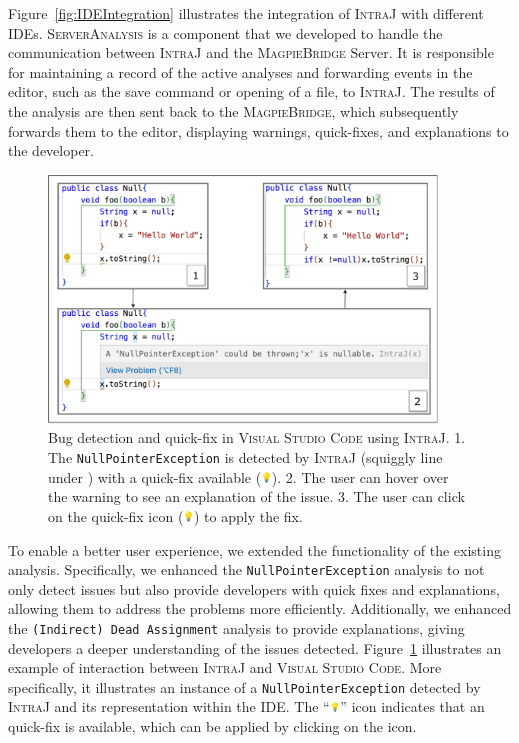 Figure~\ref{fig:IDEIntegration} illustrates the integration of \textsc{IntraJ} with
different IDEs. \textsc{ServerAnalysis} is a component that we developed to handle the
communication between \textsc{IntraJ} and the \textsc{MagpieBridge} Server. It is responsible
for maintaining a record of the active analyses and forwarding events in the editor,
such as the save command or opening of a file, to \textsc{IntraJ}.
The results of the analysis are then sent back to the \textsc{MagpieBridge}, which subsequently
forwards them to the editor, displaying warnings, quick-fixes, and explanations
to the developer.
\begin{figure}[ht]
  \centering
  \includegraphics[width=0.92\textwidth]{kappa/img/IDEExample.pdf}
  \caption{\label{fig:IDEExample} Bug detection and quick-fix in \textsc{Visual Studio Code} using \textsc{IntraJ}.
  1. The \texttt{NullPointerException} is detected by \textsc{IntraJ} (squiggly line under ) with a quick-fix available (\includegraphics[height=8pt]{kappa/img/bulb.png}).
  2. The user can hover over the warning to see an explanation of the issue.
  3. The user can click on the quick-fix icon (\includegraphics[height=8pt]{kappa/img/bulb.png}) to apply the fix.
  }
\end{figure}
To enable a better user experience, we extended the functionality of the existing analysis.
Specifically, we enhanced the \texttt{NullPointerException} analysis to not only detect issues
but also provide developers with quick fixes and explanations, allowing them to address
the problems more efficiently. Additionally, we enhanced the \texttt{(Indirect) Dead Assignment} analysis
to provide explanations, giving developers a deeper understanding of the issues detected.
Figure~\ref{fig:IDEExample} illustrates an example of interaction between \textsc{IntraJ} and
\textsc{Visual Studio Code}. More specifically, it illustrates an instance of a \texttt{NullPointerException}
detected by \textsc{IntraJ} and its representation within the IDE.
The ``\includegraphics[height=8pt]{kappa/img/bulb.png}''  icon indicates that an quick-fix is available,
which can be applied by clicking on the icon.

